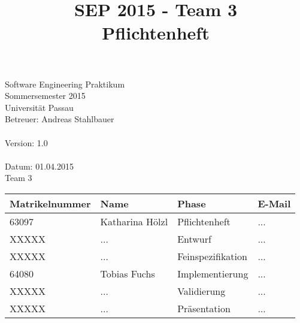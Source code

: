 \documentclass[a4paper]{scrreprt}
\begin{document}
	\thispagestyle{plain}

\begin{titlepage}
    \begin{center}

    	\begin{title}
        	\title{\Huge{\textbf{SEP 2015 - Team 3 \\ Pflichtenheft\\}}}

		\end{title}
		\hspace{3cm}

        	Software Engineering Praktikum \\
        	Sommersemester 2015\\
        	Universität Passau\\


        	Betreuer: Andreas Stahlbauer \\
        	\hspace{1,5cm}\\
        	Version: 1.0 \\
        	\hspace{1,5cm}\\
        	Datum: 01.04.2015\\[50pt]
        	Team 3 \\
    
        
        \begin{tabular}{ | l | l | l | l |}
            \hline
            \textbf{Matrikelnummer} & \textbf{Name} & \textbf{Phase} & \textbf{E-Mail}  \\ \hline
            63097 & Katharina Hölzl & Pflichtenheft & ... \\ \hline
            XXXXX & ... & Entwurf & ...  \\ \hline
            XXXXX & ... & Feinspezifikation  & ... \\ \hline
            64080 & Tobias Fuchs & Implementierung  &  ... \\ \hline
            XXXXX & ... & Validierung & ... \\ \hline  
            XXXXX & ... &  Präsentation & ... \\ \hline
        \end{tabular}
    \end{center}
\end{titlepage}
 
 

\tableofcontents
 
\printglossaries
\end{document}
